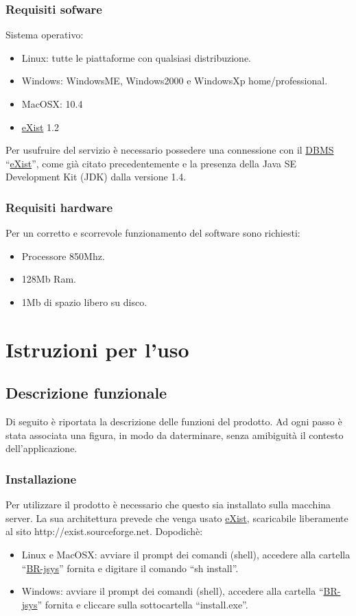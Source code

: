 \subsection{Requisiti sofware}
Sistema operativo:
\begin{itemize}
\item Linux: tutte le piattaforme con qualsiasi distribuzione.
\item Windows: WindowsME, Windows2000 e WindowsXp home/professional.
\item MacOSX: 10.4
\item \underline{eXist} 1.2
\end{itemize}
Per usufruire del servizio \`e necessario possedere una connessione con il \underline{DBMS} ``\underline{eXist}'', come gi\`a citato precedentemente e la presenza della Java SE Development Kit (JDK) dalla versione 1.4.
\subsection{Requisiti hardware}
Per un corretto e scorrevole funzionamento del software sono richiesti:
\begin{itemize}
\item Processore 850Mhz.
\item 128Mb Ram.
\item 1Mb di spazio libero su disco.
\end{itemize}

\chapter{Istruzioni per l'uso}
\section{Descrizione funzionale}
Di seguito \`e riportata la descrizione delle funzioni del prodotto. Ad ogni passo \`e stata associata una figura, in modo da daterminare, senza amibiguit\`a il contesto dell'applicazione.
\subsection{Installazione}
Per utilizzare il prodotto \`e necessario che questo sia installato sulla macchina server. La sua architettura prevede che venga usato \underline{eXist}, scaricabile liberamente al sito http://exist.sourceforge.net. Dopodich\`e:
\begin{itemize}
\item Linux e MacOSX: avviare il prompt dei comandi (shell), accedere alla cartella ``\underline{BR-jsys}'' fornita e digitare il comando ``sh install''.
\item Windows: avviare il prompt dei comandi (shell), accedere alla cartella ``\underline{BR-jsys}'' fornita e cliccare sulla sottocartella ``install.exe''.
\end{itemize}
